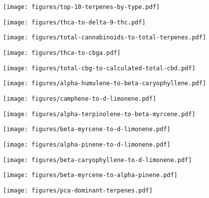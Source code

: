 \documentclass[../article.tex, 12pt]{subfiles}
\begin{document}
\texttt{[image: figures/top-10-terpenes-by-type.pdf]}

\vspace{2\baselineskip}

\texttt{[image: figures/thca-to-delta-9-thc.pdf]}

\vspace{2\baselineskip}

\texttt{[image: figures/total-cannabinoids-to-total-terpenes.pdf]}

\vspace{2\baselineskip}

\texttt{[image: figures/thca-to-cbga.pdf]}

\vspace{2\baselineskip}

\texttt{[image: figures/total-cbg-to-calculated-total-cbd.pdf]}

\vspace{2\baselineskip}

\texttt{[image: figures/alpha-humulene-to-beta-caryophyllene.pdf]}

\vspace{2\baselineskip}

\texttt{[image: figures/camphene-to-d-limonene.pdf]}

\vspace{2\baselineskip}

\texttt{[image: figures/alpha-terpinolene-to-beta-myrcene.pdf]}

\vspace{2\baselineskip}

\texttt{[image: figures/beta-myrcene-to-d-limonene.pdf]}

\vspace{2\baselineskip}

\texttt{[image: figures/alpha-pinene-to-d-limonene.pdf]}

\vspace{2\baselineskip}

\texttt{[image: figures/beta-caryophyllene-to-d-limonene.pdf]}

\vspace{2\baselineskip}

\texttt{[image: figures/beta-myrcene-to-alpha-pinene.pdf]}


\vspace{2\baselineskip}

\texttt{[image: figures/pca-dominant-terpenes.pdf]}


%
\thispagestyle{regular}

\thispagestyle{regular}
\end{document}

